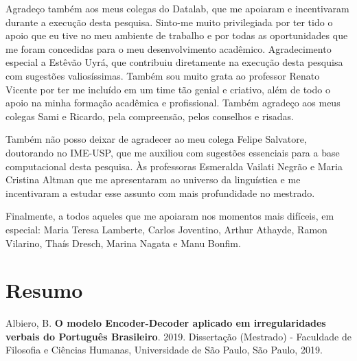 \documentclass[12pt,twoside,a4paper]{book}
\begin{document}
Agradeço também aos meus colegas do Datalab, que me apoiaram e incentivaram durante a execução desta pesquisa. Sinto-me muito privilegiada por ter tido o apoio que eu tive no meu ambiente de trabalho e por todas as oportunidades que me foram concedidas para o meu desenvolvimento acadêmico. Agradecimento especial a Estêvão Uyrá, que contribuiu diretamente na execução desta pesquisa com sugestões valiosíssimas. Também sou muito grata ao professor Renato Vicente por ter me incluído em um time tão genial e criativo, além de todo o apoio na minha formação acadêmica e profissional. Também agradeço aos meus colegas Sami e Ricardo, pela compreensão, pelos conselhos e risadas.

Também não posso deixar de agradecer ao meu colega Felipe Salvatore, doutorando no IME-USP, que me auxiliou com sugestões essenciais para a base computacional desta pesquisa. Às professoras Esmeralda Vailati Negrão e Maria Cristina Altman que me apresentaram ao universo da linguística e me incentivaram a estudar esse assunto com mais profundidade no mestrado.

Finalmente, a todos aqueles que me apoiaram nos momentos mais difíceis, em especial: Maria Teresa Lamberte, Carlos Joventino, Arthur Athayde, Ramon Vilarino, Thaís Dresch, Marina Nagata e Manu Bonfim. 

\chapter*{Resumo}
\noindent Albiero, B. \textbf{O modelo Encoder-Decoder aplicado em irregularidades verbais do Português Brasileiro}. 
2019.
Dissertação (Mestrado) - Faculdade de Filosofia e Ciências Humanas,
Universidade de São Paulo, São Paulo, 2019.
\\
\end{document}
